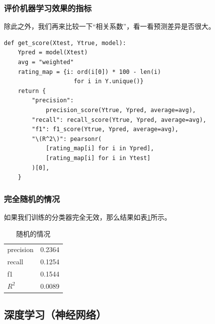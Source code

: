 \documentclass[mathserif,envcountsect,fontset=mac]{ctexbeamer}
\begin{document}
\begin{frame}[fragile]
    \frametitle{评价机器学习效果的指标}
    除此之外，我们再来比较一下“相关系数”，看一看预测差异是否很大。
    \begin{verbatim}
def get_score(Xtest, Ytrue, model):
    Ypred = model(Xtest)
    avg = "weighted"
    rating_map = {i: ord(i[0]) * 100 - len(i)
                    for i in Y.unique()}
    return {
        "precision":
            precision_score(Ytrue, Ypred, average=avg),
        "recall": recall_score(Ytrue, Ypred, average=avg),
        "f1": f1_score(Ytrue, Ypred, average=avg),
        "\(R^2\)": pearsonr(
            [rating_map[i] for i in Ypred],
            [rating_map[i] for i in Ytest]
        )[0],
    }
\end{verbatim}
\end{frame}
\begin{frame}
    \frametitle{完全随机的情况}
    如果我们训练的分类器完全无效，那么结果如表\ref{random}所示。
    \begin{table}
        \caption{随机的情况}
        \begin{tabular}{ll}
            precision & 0.2364 \\
            recall    & 0.1254 \\
            f1        & 0.1544 \\
            \(R^2\)   & 0.0089 \\
        \end{tabular}
        \label{random}
    \end{table}
\end{frame}
\subsection{深度学习（神经网络）}
\end{document}
